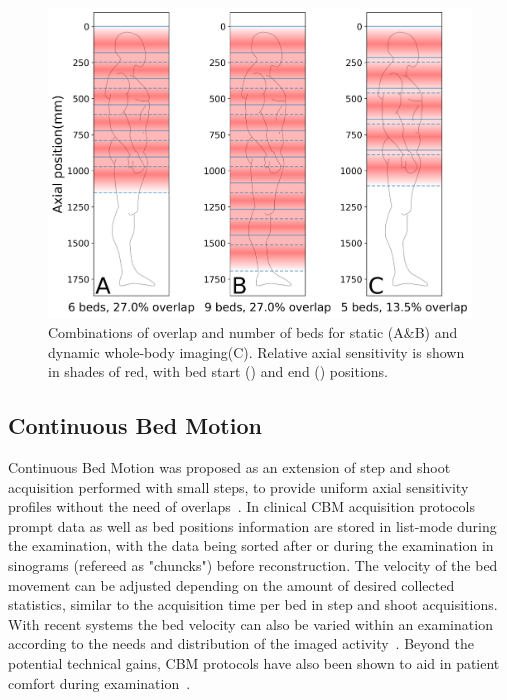 %
%
\begin{figure} [ht!]
\centering
\includegraphics[scale=0.5,angle=0]{3_Results/3_1_DWB_Optimization/figures/SensitivityProfiles_overHuman.png}
\caption{Combinations of overlap and number of beds for static (A\&B) and dynamic whole-body imaging(C). Relative axial sensitivity is shown in shades of red, with bed start (\protect{}) and end (\protect{}) positions.} 
\label{fig3_1:BodyCoverage}
\end{figure}



\subsection{Continuous Bed Motion}
Continuous Bed Motion was proposed as an extension of step and shoot acquisition performed with small steps, to provide uniform axial sensitivity profiles without the need of overlaps~\cite{Dahlbom2001,Brasse2002}. In clinical CBM acquisition protocols prompt data as well as bed positions information are stored in list-mode during the examination, with the data being sorted after or during the examination in sinograms (refereed as "chuncks") before reconstruction. The velocity of the bed movement can be adjusted depending on the amount of desired collected statistics, similar to the acquisition time per bed in step and shoot acquisitions. With recent systems the bed velocity can also be varied within an examination according to the needs and distribution of the imaged activity~\cite{Panin2014}. Beyond the potential technical gains, CBM protocols have also been shown to aid in patient comfort during examination~\cite{Schatka2016}. 

